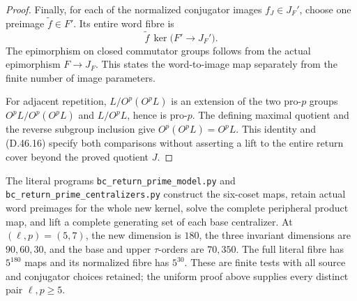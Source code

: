 \begin{proof}
Finally, for each of the normalized conjugator images
\(f_J\in J_F'\), choose one preimage
\(\widetilde f\in F'\). Its entire word fibre is
\[
       \widetilde f\,
         \ker\bigl(F'\longrightarrow J_F'\bigr).
 \tag{D.46.17}
\]
The epimorphism on closed commutator groups follows from
the actual epimorphism \(F\to J_F\).
This states the word-to-image map separately from the
finite number of image parameters.

For adjacent repetition, \(L/O^p(O^pL)\) is an
extension of the two pro-\(p\) groups
\(O^pL/O^p(O^pL)\) and \(L/O^pL\), hence is
pro-\(p\). The defining maximal quotient and the
reverse subgroup inclusion give
\(O^p(O^pL)=O^pL\).
This identity and \textup{(D.46.16)} specify both
comparisons without asserting a lift to the entire
return cover beyond the proved quotient \(J\).
\end{proof}

The literal programs
\texttt{bc\_return\_prime\_\allowbreak model.py} and
\texttt{bc\_return\_prime\_\allowbreak centralizers.py}
construct the six-coset maps, retain actual word
preimages for the whole new kernel, solve the complete
peripheral product map, and lift a complete generating
set of each base centralizer. At \((\ell,p)=(5,7)\),
the new dimension is \(180\), the three invariant
dimensions are \(90,60,30\), and the base and upper
\(\tau\)-orders are \(70,350\). The full literal
fibre has \(5^{180}\) maps and its normalized fibre
has \(5^{30}\). These are finite tests with all source
and conjugator choices retained; the uniform proof
above supplies every distinct pair \(\ell,p\geq5\).
